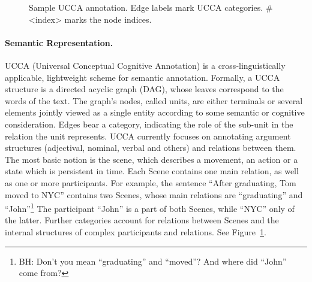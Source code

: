\documentclass[11pt]{article}
\newcommand{\figref}[1]{Figure~\ref{#1}}
\newcommand{\bh}[2]{\footnote{\color{blue}BH: #1}}
\begin{document}
\begin{figure}
  
\caption{\label{fig:ucca_example}
  Sample UCCA annotation. Edge labels mark UCCA categories. \#<index> marks the node
indices.}
\end{figure}


\paragraph{Semantic Representation.}
UCCA (Universal Conceptual Cognitive Annotation) is a cross-linguistically applicable, lightweight
scheme for semantic annotation. Formally, a UCCA structure is a directed acyclic graph (DAG),
whose leaves correspond to the words of the text.
The graph’s nodes, called {\sc units}, are either terminals or several elements jointly
viewed as a single entity according to some semantic or cognitive consideration. Edges bear
a category, indicating the role of the sub-unit in the relation the unit represents. UCCA
currently focuses on annotating argument structures (adjectival, nominal, verbal and others) and
relations between them. The most basic notion is the {\sc scene}, which describes a movement, an
action or a state which is persistent in time. Each Scene contains one main relation, as well
as one or more participants. For example, the sentence ``After graduating, Tom moved to NYC''
contains two Scenes, whose main relations are ``graduating'' and ``John''\bh{Don't you mean ``graduating'' and
``moved''? And where did ``John'' come from?}. The participant ``John''
is a part of both Scenes, while ``NYC'' only of the latter. Further categories account for
relations between Scenes and the internal structures of complex participants and relations.
See \figref{fig:ucca_example}.
\end{document}
